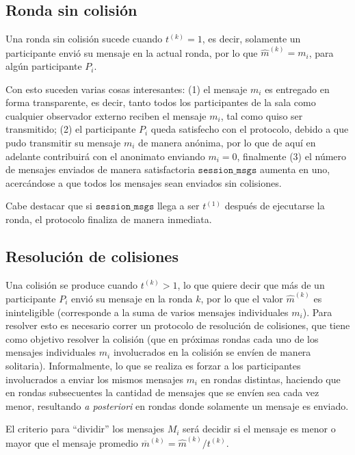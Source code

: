 \subsection{Ronda sin colisión}

Una ronda sin colisión sucede cuando $t^{(k)} = 1$, es decir, solamente un participante 
envió su mensaje en la actual ronda, por lo que $\hat{m}^{(k)} = m_i$, para algún 
participante $P_i$.

Con esto suceden varias cosas interesantes: (1) el mensaje $m_i$ es entregado en forma 
transparente, es decir, tanto todos los participantes de la sala como cualquier observador 
externo reciben el mensaje $m_i$, tal como quiso ser transmitido; (2) el participante $P_i$ 
queda satisfecho con el protocolo, debido a que pudo transmitir su mensaje $m_i$ de manera 
anónima, por lo que de aquí en adelante contribuirá con el anonimato enviando $m_i = 0$, 
finalmente (3) el número de mensajes enviados de manera satisfactoria $\mathtt{session\_msgs}$ 
aumenta en uno, acercándose a que todos los mensajes sean enviados sin colisiones.

Cabe destacar que si $\mathtt{session\_msgs}$ llega a ser $t^{(1)}$ después de ejecutarse 
la ronda, el protocolo finaliza de manera inmediata.

\subsection{Resolución de colisiones}

Una colisión se produce cuando $t^{(k)} > 1$, lo que quiere decir que más de un 
participante $P_i$ envió su mensaje en la ronda $k$, por lo que el valor $\hat{m}^{(k)}$ 
es ininteligible (corresponde a la suma de varios mensajes individuales $m_i$). Para resolver 
esto es necesario correr un protocolo de resolución de colisiones, que tiene como objetivo 
resolver la colisión (que en próximas rondas cada uno de los mensajes individuales $m_i$ 
involucrados en la colisión se envíen de manera solitaria). Informalmente, lo que se realiza 
es forzar a los participantes involucrados a enviar los mismos mensajes $m_i$ en rondas 
distintas, haciendo que en rondas subsecuentes la cantidad de mensajes que se envíen sea 
cada vez menor, resultando \emph{a posteriori} en rondas donde solamente un mensaje es enviado.

El criterio para ``dividir'' los mensajes $M_i$ será decidir si el mensaje es menor o mayor que 
el mensaje promedio $\overline{m}^{(k)} = \hat{m}^{(k)} / t^{(k)}$.

